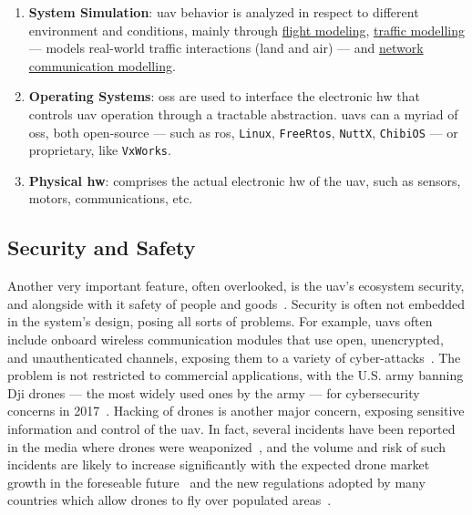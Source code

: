 \begin{enumerate}
  safely, through the transmission of commands to the \gls{uav}, yielded by an
  human operator of computer-generated via autopilot. The command is sent to the
  \gls{uav} via proprietary protocols or open \glspl{api} (e.g., MAVLink
  \gls{sdk} or Parrot \gls{sdk}). The autopilot consists in \gls{sw} stack
  running on the \gls{fcs}. Noticeable open-source autopilots are
  \lstinline{PX4}, \lstinline{ArduPilot}, and \lstinline{Paparazzi}.
\item \textbf{System Simulation}: \gls{uav} behavior is analyzed in respect to
  different environment and conditions, mainly through \underline{flight
    modeling},
  \underline{traffic modelling} --- models real-world traffic interactions
  (land and air) --- and
  \underline{network communication modelling}. 
\item \textbf{Operating Systems}: \glspl{os} are used to interface the
  electronic \gls{hw} that controls \gls{uav} operation through a tractable
  abstraction. \glspl{uav} can a myriad of \glspl{os}, both open-source --- such as
  \gls{ros}, \lstinline{Linux}, \lstinline{FreeRtos}, \lstinline{NuttX}, \lstinline{ChibiOS} --- or proprietary, like \lstinline{VxWorks}. 
\item \textbf{Physical \gls{hw}}: comprises the actual electronic \gls{hw} of
  the \gls{uav}, such as sensors, motors, communications, etc.
\end{enumerate}


\subsection{Security and Safety}%
\label{sec:security-safety}
Another very important feature, often overlooked, is the \gls{uav}'s ecosystem
security, and alongside with it safety of people and goods~\cite{leccadito2018survey}. Security is often
not embedded in the system's design, posing all sorts of problems. For example,
\glspl{uav} often include onboard wireless communication modules that use open,
unencrypted, and unauthenticated channels, exposing them to a variety of
cyber-attacks~\cite{kishnaCyberVulnerUAVReview2017,mansfieldUAVCyberThreats2013}.
The problem is not restricted to
commercial applications, with the U.S. army banning Dji drones --- the most
widely used ones by the army --- for cybersecurity
concerns in 2017~\cite{suasNewsDjiDronesBanned2017}. Hacking of drones is
another major concern, exposing sensitive information and control of the
\gls{uav}. In fact, several incidents have been reported in the media where
drones were weaponized~\cite{spiegelUAVAccident2015,nytimesUAVAccident2018,theDriveUAVAccident2019}, and the volume and risk of such incidents are
likely to increase significantly with the expected drone market growth in the
foreseable future~\cite{mohsan2022towards} and the new regulations adopted by many countries which allow
drones to fly over populated areas~\cite{stocker2017UAVRegulationsReview}.

